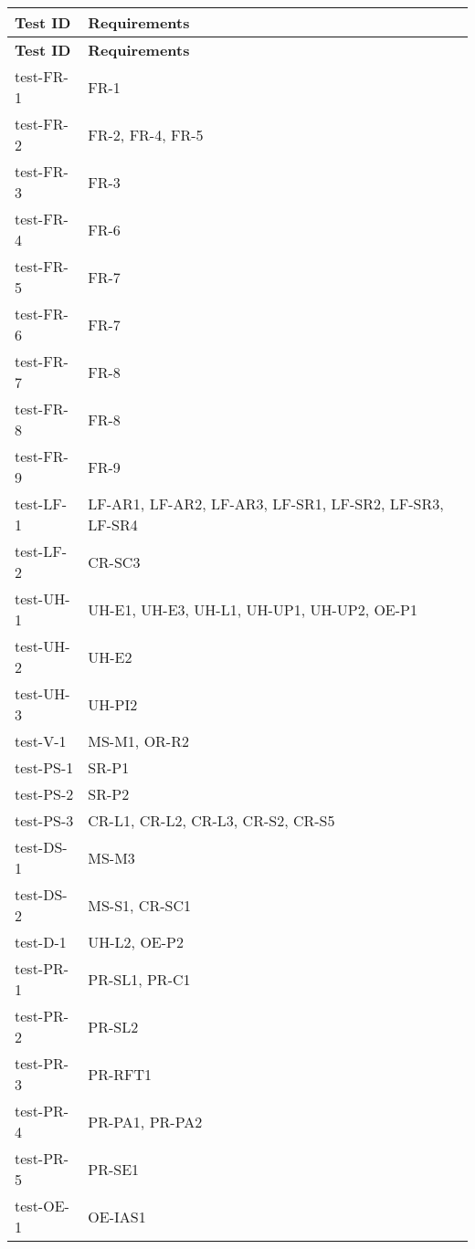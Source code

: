 \documentclass[12pt, titlepage]{article}
\begin{document}
\begin{center}
  \begin{longtable}{|>{\centering\arraybackslash}p{4cm}|>{\centering\arraybackslash}p{10cm}|}
  \hline
  \textbf{Test ID} & \textbf{Requirements} \\
  \hline
  \endfirsthead
  
  \hline
  \textbf{Test ID} & \textbf{Requirements} \\
  \hline
  \endhead
  
  test-FR-1 & FR-1 \\
  \hline
  test-FR-2 & FR-2, FR-4, FR-5 \\
  \hline
  test-FR-3 & FR-3 \\
  \hline
  test-FR-4 & FR-6 \\
  \hline
  test-FR-5 & FR-7 \\
  \hline
  test-FR-6 & FR-7 \\
  \hline
  test-FR-7 & FR-8 \\
  \hline
  test-FR-8 & FR-8 \\
  \hline
  test-FR-9 & FR-9 \\
  \hline
  test-LF-1 & LF-AR1, LF-AR2, LF-AR3, LF-SR1, LF-SR2, LF-SR3, LF-SR4 \\
  \hline
  test-LF-2 & CR-SC3 \\
  \hline
  test-UH-1 & UH-E1, UH-E3, UH-L1, UH-UP1, UH-UP2, OE-P1 \\
  \hline
  test-UH-2 & UH-E2 \\
  \hline
  test-UH-3 & UH-PI2 \\
  \hline
  test-V-1 & MS-M1, OR-R2 \\
  \hline
  test-PS-1 & SR-P1 \\
  \hline
  test-PS-2 & SR-P2 \\
  \hline
  test-PS-3 & CR-L1, CR-L2, CR-L3, CR-S2, CR-S5 \\
  \hline
  test-DS-1 & MS-M3 \\
  \hline
  test-DS-2 & MS-S1, CR-SC1 \\
  \hline
  test-D-1 & UH-L2, OE-P2 \\
  \hline
  test-PR-1 & PR-SL1, PR-C1 \\
  \hline
  test-PR-2 & PR-SL2 \\
  \hline
  test-PR-3 & PR-RFT1 \\
  \hline
  test-PR-4 & PR-PA1, PR-PA2 \\
  \hline
  test-PR-5 & PR-SE1 \\
  \hline
  test-OE-1 & OE-IAS1 \\

\end{longtable}
\end{center}
\end{document}
